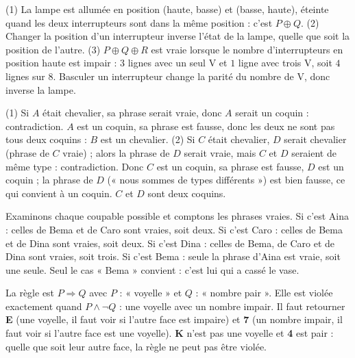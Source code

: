 \begin{solution}
(1) La lampe est allumée en position (haute, basse) et (basse, haute), éteinte quand les deux interrupteurs sont dans la même position : c'est $P\oplus Q$. (2) Changer la position d'un interrupteur inverse l'état de la lampe, quelle que soit la position de l'autre. (3) $P\oplus Q\oplus R$ est vraie lorsque le nombre d'interrupteurs en position haute est impair : $3$ lignes avec un seul V et $1$ ligne avec trois V, soit $4$ lignes sur $8$. Basculer un interrupteur change la parité du nombre de V, donc inverse la lampe.
\end{solution}
\begin{solution}
(1) Si $A$ était chevalier, sa phrase serait vraie, donc $A$ serait un coquin : contradiction. $A$ est un coquin, sa phrase est fausse, donc les deux ne sont pas tous deux coquins : $B$ est un chevalier. (2) Si $C$ était chevalier, $D$ serait chevalier (phrase de $C$ vraie) ; alors la phrase de $D$ serait vraie, mais $C$ et $D$ seraient de même type : contradiction. Donc $C$ est un coquin, sa phrase est fausse, $D$ est un coquin ; la phrase de $D$ (« nous sommes de types différents ») est bien fausse, ce qui convient à un coquin. $C$ et $D$ sont deux coquins.
\end{solution}
\begin{solution}
Examinons chaque coupable possible et comptons les phrases vraies. Si c'est Aina : celles de Bema et de Caro sont vraies, soit deux. Si c'est Caro : celles de Bema et de Dina sont vraies, soit deux. Si c'est Dina : celles de Bema, de Caro et de Dina sont vraies, soit trois. Si c'est Bema : seule la phrase d'Aina est vraie, soit une seule. Seul le cas « Bema » convient : c'est lui qui a cassé le vase.
\end{solution}
\begin{solution}
La règle est $P\Rightarrow Q$ avec $P$ : « voyelle » et $Q$ : « nombre pair ». Elle est violée exactement quand $P\land\lnot Q$ : une voyelle avec un nombre impair. Il faut retourner \textbf{E} (une voyelle, il faut voir si l'autre face est impaire) et \textbf{7} (un nombre impair, il faut voir si l'autre face est une voyelle). \textbf{K} n'est pas une voyelle et \textbf{4} est pair : quelle que soit leur autre face, la règle ne peut pas être violée.
\end{solution}
